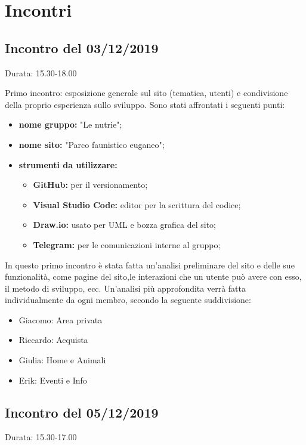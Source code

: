 \section{Incontri}

\subsection{Incontro del 03/12/2019}
    Durata: 15.30-18.00

    Primo incontro: esposizione generale sul sito (tematica, utenti) e condivisione della proprio esperienza sullo sviluppo.
    Sono stati affrontati i seguenti punti:
    
    \begin{itemize}
        \item \textbf{nome gruppo:} "Le nutrie"; 
        \item \textbf{nome sito:} "Parco faunistico euganeo"; 
        \item \textbf{strumenti da utilizzare:}
            \begin{itemize}
                \item \textbf{GitHub:} per il versionamento; 
                \item \textbf{Visual Studio Code:} editor per la scrittura del codice; 
                \item \textbf{Draw.io:} usato per UML e bozza grafica del sito;
                \item \textbf{Telegram:} per le comunicazioni interne al gruppo;
            \end{itemize}
    \end{itemize}

    In questo primo incontro è stata fatta un'analisi preliminare del sito e delle sue funzionalità, come pagine del sito,le interazioni che un utente può avere con esso, il metodo di sviluppo, ecc.
    Un'analisi più approfondita verrà fatta individualmente da ogni membro, secondo la seguente suddivisione:
    \begin{itemize}
        \item Giacomo: Area privata
        \item Riccardo: Acquista
        \item Giulia: Home e Animali
        \item Erik: Eventi e Info
    \end{itemize}

\subsection{Incontro del 05/12/2019}
    Durata: 15.30-17.00

